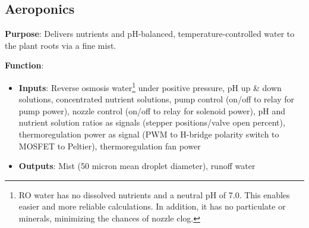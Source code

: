 \documentclass{../tex/report}
\begin{document}
\vspace{1cm}

\subsection{Aeroponics}
\label{sec:aeroponics}

\textbf{Purpose}: Delivers nutrients and pH-balanced, temperature-controlled water to the plant roots via a fine mist.

\textbf{Function}:
\begin{itemize}
    \item \textbf{Inputs}: Reverse osmosis water\footnote{RO water has no dissolved nutrients and a neutral pH of 7.0. This enables easier and more reliable calculations. In addition, it has no particulate or minerals, minimizing the chances of nozzle clog.} under positive pressure, pH up \& down solutions, concentrated nutrient solutions, pump control (on/off to relay for pump power), nozzle control (on/off to relay for solenoid power), pH and nutrient solution ratios as signals (stepper positions/valve open percent), thermoregulation power as signal (PWM to H-bridge polarity switch to MOSFET to Peltier), thermoregulation fan power
    \item \textbf{Outputs}: Mist (50 micron mean droplet diameter), runoff water
\end{itemize}
\end{document}
